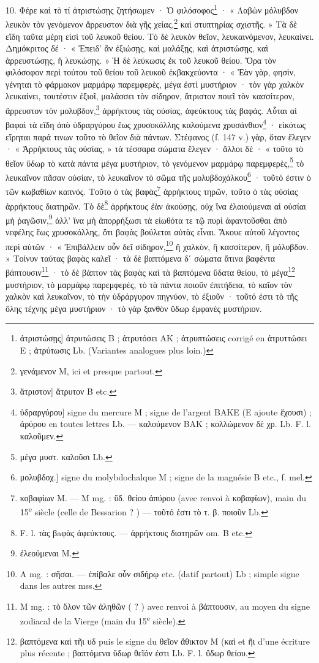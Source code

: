 \documentclass[landscape, a4paper, 11pt, oneside, polutonikogreek, french]{article}
\begin{document}
10. Φέρε καὶ τὸ τί ἀτριστώσῃς ζητήσωμεν · Ὁ φιλόσοφος\footnote{ἀτριστώσῃς] ἀτρυτώσεις B ; ἀτρυτόσει AK ; ἀτρυπτώσεις corrigé en ἀτρυττώσει E ; ἀτρύτωσις Lb. (Variantes analogues plus loin.)} · « Λαβὼν μόλυβδον λευκὸν τὸν γενόμενον ἄρρευστον διὰ γῆς χείας,\footnote{γενάμενον M, ici et presque partout.} καὶ στυπτηρίας σχιστῆς. » Τὰ δὲ εἴδη ταῦτα μέρη εἰσὶ τοῦ λευκοῦ θείου. Τὸ δὲ λευκὸν θεῖον, λευκαινόμενον, λευκαίνει. Δημόκριτος δέ · « Ἐπειδ' ἂν ἐξιώσῃς, καὶ μαλάξῃς, καὶ ἀτριστώσῃς, καὶ ἀρρευστώσῃς, ἢ λευκώσῃς. » Ἡ δὲ λεύκωσις ἐκ τοῦ λευκοῦ θείου. Ὅρα τὸν φιλόσοφον περὶ τούτου τοῦ θείου τοῦ λευκοῦ ἐκβακχεύοντα · « Ἐὰν γὰρ, φησὶν, γένηται τὸ φάρμακον μαρμάρῳ παρεμφερὲς, μέγα ἐστὶ μυστήριον · τὸν γὰρ χαλκὸν λευκαίνει, τουτέστιν ἐξιοῖ, μαλάσσει τὸν σίδηρον, ἄτριστον ποιεῖ τὸν κασσίτερον, ἄρρευστον τὸν μολυβδον,\footnote{ἄτριστον] ἄτρυτον B etc.} ἀρρήκτους τὰς οὐσίας, ἀφεύκτους τὰς βαφάς. Αὗται αἱ βαφαὶ τὰ εἴδη ἀπὸ ὑδραργύρου ἕως χρυσοκόλλης καλούμενα χρυσάνθιον\footnote{ὑδραργύρου] signe du mercure M ; signe de l'argent BAKE (E ajoute ἔχουσι) ; ἀρύρου en toutes lettres Lb. --- καλούμενον BAΚ ; κολλώμενον δὲ χρ. Lb. F. l. καλοῦμεν.} · εἰκότως εἴρηται παρά τινων τοῦτο τὸ θεῖον διὰ πάντων. Στέφανος (f. 147 v.) γὰρ, ὅταν ἔλεγεν · « Ἀρρήκτους τὰς οὐσίας, » τὰ τέσσαρα σώματα ἔλεγεν · ἄλλοι δὲ · « τοῦτο τὸ θεῖον ὕδωρ τὸ κατὰ πάντα μέγα μυστήριον, τὸ γενόμενον μαρμάρῳ παρεμφερὲς,\footnote{μέγα μυστ. καλοῦσι Lb.} τὸ λευκαῖνον πᾶσαν οὐσίαν, τὸ λευκαῖνον τὸ σῶμα τῆς μολυβδοχάλκου\footnote{μολυβδοχ.] signe du molybdochalque M ; signe de la magnésie B etc., f. mel.} · τοῦτό ἐστιν ὁ τῶν κωβαθίων καπνός. Τοῦτο ὁ τὰς βαφὰς\footnote{κοβαφίων M. --- M mg. : ὕδ. θείου ἀπύρου (avec renvoi à κοβαφίων), main du 15\textsuperscript{e} siècle (celle de Bessarion ? ) --- τοῦτό ἐστι τὸ τ. β. ποιοῦν Lb.} ἀρρήκτους τηρῶν, τοῦτο ὁ τὰς οὐσίας ἀρρήκτους διατηρῶν. Τὸ δὲ\footnote{F. l. τὰς βaφὰς ἀφεύκτους. --- ἀρρήκτους διατηρῶν om. B etc.} ἀρρήκτους ἐὰν ἀκούσῃς, οὐχ ἵνα ἐλαιούμεναι αἱ οὐσίαι μὴ ῥαγῶσιν,\footnote{ἐλεούμεναι M.} ἀλλ' ἵνα μὴ ἀπορρήξωσι τὰ εἰωθότα τε τῷ πυρὶ ἀφαντοῦσθαι ἀπὸ νεφέλης ἕως χρυσοκόλλης, ὅτι βαφὰς βούλεται αὐτὰς εἶναι. Ἄκουε αὐτοῦ λέγοντος περὶ αὐτῶν · « Ἐπιβάλλειν οὖν δεῖ σίδηρον,\footnote{A mg. : σῆσαι. --- ἐπίβαλε οὗν σιδήρῳ etc. (datif partout) Lb ; simple signe dans les autres mss.} ἢ χαλκὸν, ἢ κασσίτερον, ἢ μόλυβδον. » Τοίνυν ταύτας βαφὰς καλεῖ · τὰ δὲ βαπτόμενα δʹ σώματα ἅτινα βαφέντα βάπτουσιν\footnote{M mg. : τὸ ὅλον τῶν ἀληθῶν ( ? ) avec renvoi à βάπτουσιν, au moyen du signe zodiacal de la Vierge \virgo (main du 15\textsuperscript{e} siècle).} · τὸ δὲ βάπτον τὰς βαφὰς καὶ τὰ βαπτόμενα ὕδατα θείου, τὸ μέγα\footnote{βαπτόμενα καὶ τῆι υδ puis le signe du θεῖον ἄθικτον M (καὶ et ῆι d'une écriture plus récente ; βαπτόμενα ὕδωρ θεῖόν ἐστι Lb. F. l. ὕδωρ θείου.} μυστήριον, τὸ μαρμάρῳ παρεμφερὲς, τὸ τὰ πάντα ποιοῦν ἐπιτήδεια, τὸ καῖον τὸν χαλκὸν καὶ λευκαῖνον, τὸ τὴν ὑδράργυρον πηγνύον, τὸ ἐξιοῦν · τοῦτό ἐστι τὸ τῆς ὅλης τέχνης μέγα μυστήριον · τὸ γὰρ ξανθὸν ὕδωρ ἐμφανὲς μυστήριον.
\end{document}
